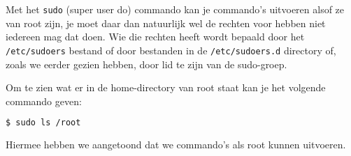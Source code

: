 Met het \texttt{sudo} (super user do) commando kan je commando's uitvoeren alsof ze van root zijn, je moet daar dan natuurlijk wel de rechten voor hebben niet iedereen mag dat doen. Wie die rechten heeft wordt bepaald door het \texttt{/etc/sudoers} bestand of door bestanden in de \texttt{/etc/sudoers.d} directory of, zoals we eerder gezien hebben, door lid te zijn van de sudo-groep.

Om te zien wat er in de home-directory van root staat kan je het volgende commando geven:
\begin{lstlisting}[language=bash]
$ sudo ls /root
\end{lstlisting}
Hiermee hebben we aangetoond dat we commando's als root kunnen uitvoeren.
